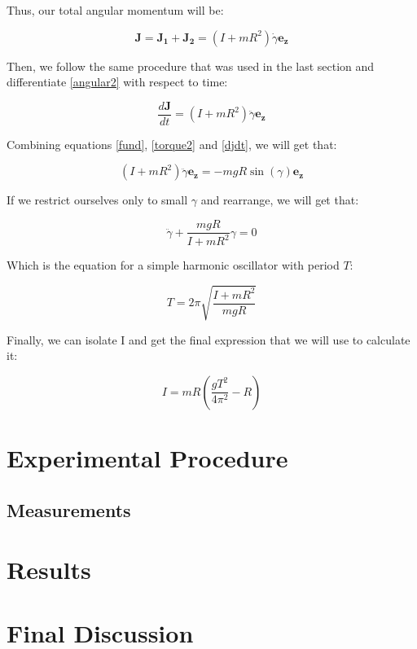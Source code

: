 \documentclass[a4paper,12pt]{article}
\begin{document}
Thus, our total angular momentum will be:

\begin{equation}
	\label{angular2}
	\boldsymbol{J} = \boldsymbol{J_1} + \boldsymbol{J_2} = \left(I + mR^2\right) \dot{\gamma} \boldsymbol{e_z} 
\end{equation}

Then, we follow the same procedure that was used in the last section and differentiate \ref{angular2} with respect to time:

\begin{equation}
	\label{djdt}
	\frac{d\boldsymbol{J}}{dt} =\left(I + mR^2\right) \ddot{\gamma} \boldsymbol{e_z}
\end{equation}

Combining equations \eqref{fund}, \eqref{torque2} and \eqref{djdt},  we will get that:

$$\left(I + mR^2\right) \ddot{\gamma} \boldsymbol{e_z} = -mgR \sin(\gamma) \boldsymbol{e_z} $$

If we restrict ourselves only to small $\gamma$ and rearrange, we will get that:

\begin{equation}
	\ddot{\gamma} + \frac{mgR}{I + mR^2} \gamma = 0
\end{equation}

Which is the equation for a simple harmonic oscillator with period $T$:

\begin{equation}
	T = 2\pi\sqrt{\frac{I + mR^2}{mgR}}
\end{equation}

Finally, we can isolate I and get the final expression that we will use to calculate it:

\begin{equation}
	\label{Moment}
	I = mR\left(\frac{g T^2}{4\pi^2} - R\right)
\end{equation}
\section{Experimental Procedure}

\subsection{Measurements}

\section{Results}

\section{Final Discussion}
\end{document}
